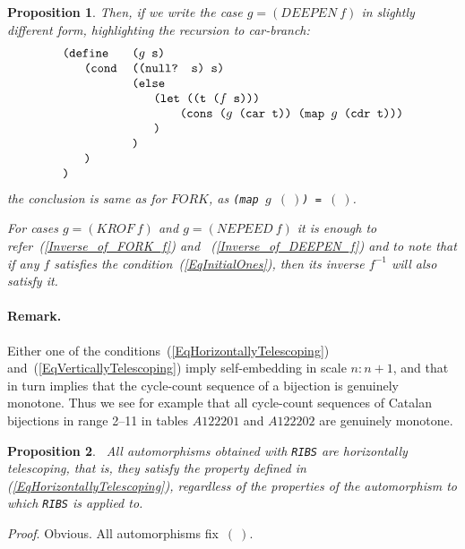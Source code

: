 \documentclass[11pt]{article} %
\newtheorem{propo}{Proposition}
\newcommand{\eqn}[1]{(\ref{#1})}
\newcommand{\eeq}{\end{equation}}
\newcommand{\beql}[1]{\begin{equation}\label{#1}}
\newcommand{\scmcode}[1]{{\tt{#1}}}
\newcommand{\scmcodeintext}[1]{{\tt{#1}}}
\newenvironment{scmdefinefun7}{\begin{tabular}{l l l l l l l}}{\end{tabular}}
\newcommand{\nilatom}{\ensuremath{\mathbf{(~)}}\xspace}
\begin{document}
\begin{propo}
Then, if we write the case $g = (DEEPEN~f)$ in slightly different form,
highlighting the recursion to car-branch:
\beql{WWW_SchemeCodeFor_g_DEEPEN_f}
\begin{scmdefinefun7}

\multicolumn{2}{l}{\scmcode{(define}} & \multicolumn{2}{l}{\scmcode{($g$ s)}}\\
 & \scmcode{(cond} & \multicolumn{3}{l}{\scmcode{((null? s) s)}}\\
 &                 & \multicolumn{2}{l}{\scmcode{(else}}\\
 &                 & & \multicolumn{2}{l}{\scmcode{(let ((t ($f$ s)))}}\\
 &                 & & & \scmcode{(cons ($g$ (car t)) (map $g$ (cdr t)))}\\
 &                 & & \scmcode{)}\\
& & \scmcode{)}\\
& \scmcode{)}\\
\scmcode{)}\\

\end{scmdefinefun7}
\eeq
the conclusion is same as for $FORK$,
as \scmcodeintext{(map $g$ \nilatom) = \nilatom}.

For cases $g = (KROF~f)$ and $g = (NEPEED~f)$ it is enough to
refer~\eqn{Inverse_of_FORK_f} and ~\eqn{Inverse_of_DEEPEN_f}
and to note that if any $f$ satisfies the
condition~\eqn{EqInitialOnes}, then its inverse $f^{-1}$ will also
satisfy it.

\end{propo}

\paragraph{Remark.}
Either one of the conditions~\eqn{EqHorizontallyTelescoping}
and~\eqn{EqVerticallyTelescoping} imply self-embedding in scale $n:n+1$,
and that in turn implies that the cycle-count sequence of a bijection
is genuinely monotone.
Thus we see for example that all cycle-count sequences of
Catalan bijections in range 2--11 in tables $A122201$ and $A122202$
are genuinely monotone.

\begin{propo}~\label{schemeMhorizontally}
All automorphisms obtained with \scmcodeintext{RIBS}
are horizontally telescoping, that is, they satisfy the property defined in
\eqn{EqHorizontallyTelescoping}, regardless of the properties of the
automorphism to which \scmcodeintext{RIBS} is applied to.
\end{propo}
\textit{Proof}. Obvious. All automorphisms fix~\nilatom.
\end{document}

